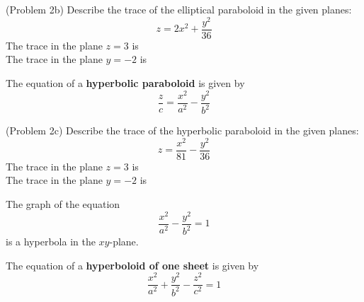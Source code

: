\documentclass[handout]{ximera}
\begin{document}
\begin{problem}(Problem 2b)
Describe the trace of the elliptical paraboloid in the given planes:
\[
z = 2x^2 + \frac{y^2}{36}
\]
The trace in the plane $z = 3$ is \\
The trace in the plane $y = -2$ is 
\end{problem}

The equation of a \textbf{hyperbolic paraboloid} is given by 
\[
\frac{z}{c} = \frac{x^2}{a^2} - \frac{y^2}{b^2} 
\]

\begin{image}
\end{image}


\begin{problem}(Problem 2c)
Describe the trace of the hyperbolic paraboloid in the given planes:
\[
z = \frac{x^2}{81} -  \frac{y^2}{36}
\]
The trace in the plane $z = 3$ is \\
The trace in the plane $y = -2$ is 
\begin{hint}
The graph of the equation
\[
\frac{x^2}{a^2} - \frac{y^2}{b^2} = 1
\]
is a hyperbola in the $xy$-plane.
\end{hint}
\end{problem}


The equation of a \textbf{hyperboloid of one sheet} is given by 
\[
\frac{x^2}{a^2} + \frac{y^2}{b^2}- \frac{z^2}{c^2} = 1
\]

\begin{image}
\end{image}
\end{document}
